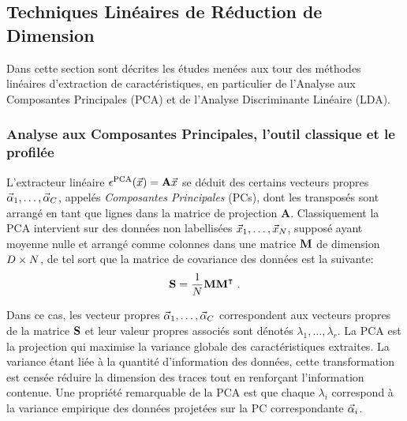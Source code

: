 \subsection{Techniques Lin\'{e}aires de R\'{e}duction de Dimension}\label{sec:lin}
Dans cette section sont d\'{e}crites les \'{e}tudes men\'{e}es aux tour des m\'{e}thodes lin\'{e}aires d'extraction de caract\'{e}ristiques, en particulier de l'Analyse aux Composantes Principales (PCA) et de l'Analyse Discriminante Lin\'{e}aire (LDA). 
\subsubsection{Analyse aux Composantes Principales, l'outil classique et le profil\'{e}e}
L'extracteur lin\'{e}aire $\epsilon^{\mathrm{PCA}}(\vec{x}) = \textbf{A}\vec{x}$ se d\'{e}duit des certains vecteurs propres $\vec{\alpha}_1, \dots, \vec{\alpha}_C$, appel\'{e}s \emph{Composantes Principales} (PCs), dont les transpos\'{e}s sont arrang\'{e} en tant que lignes dans la matrice de projection $\textbf{A}$. Classiquement la PCA intervient sur des donn\'{e}es non labellis\'{e}es $\vec{x}_1, \dots , \vec{x}_N$, suppos\'{e} ayant moyenne nulle et arrang\'{e} comme colonnes dans une matrice  $\textbf{M}$ de dimension $D \times N$, de tel sort que la matrice de covariance des donn\'{e}es est la suivante:
\begin{equation}\label{eq:covmat}
\textbf{S} = \frac{1}{N}\textbf{M}\textbf{M}^\intercal \mbox{ .}
\end{equation}

Dans ce cas, les vecteur propres $\vec{\alpha}_1, \dots, \vec{\alpha}_C$ correspondent aux vecteurs propres de la matrice $\textbf{S}$ et leur valeur propres associ\'{e}s sont d\'{e}not\'{e}s $\lambda_1, \dots, \lambda_r$. La PCA est la projection qui maximise la variance globale des caract\'{e}ristiques extraites. La variance \'{e}tant li\'{e}e \`{a} la quantit\'{e} d'information des donn\'{e}es, cette transformation est cens\'{e}e r\'{e}duire la dimension des traces tout en renforçant l'information contenue. Une propri\'{e}t\'{e} remarquable de la PCA est que chaque $\lambda_i$ correspond \`{a} la variance empirique des donn\'{e}es projet\'{e}es sur la PC correspondante $\vec{\alpha}_i$.\\

